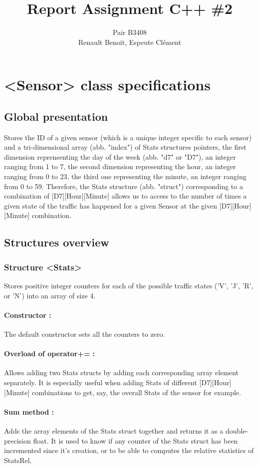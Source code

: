 \documentclass[10pt]{article}
\title{Report Assignment C++ \#2}
\author{Pair B3408 \\ {\sc Renault} Benoit, {\sc Espeute} Clément}
\date{}
\begin{document}
\pagestyle{fancy}
\maketitle
\section{<Sensor> class specifications}
\subsection{Global presentation}
Stores the ID of a given sensor (which is a unique integer specific to each sensor) and a tri-dimensional array (abb. "index") of Stats structures pointers, the first dimension reprensenting the day of the week (abb. "d7" or "D7"), an integer ranging from 1 to 7, the second dimension representing the hour, an integer ranging from 0 to 23, the third one representing the minute, an integer ranging from 0 to 59. Therefore, the Stats structure (abb. "struct") corresponding to a combination of [D7][Hour][Minute] allows us to access to the number of times a given state of the traffic has happened for a given Sensor at the given [D7][Hour][Minute] combination.

\subsection{Structures overview}
\subsubsection*{Structure <Stats>}
Stores positive integer counters for each of the possible traffic states ('V', 'J', 'R', or 'N') into an array of size 4.

\paragraph{Constructor :}
The default constructor sets all the counters to zero.

\paragraph{Overload of operator+= :}
Allows adding two Stats structs by adding each corresponding array element separately. It is especially useful when adding Stats of different [D7][Hour][Minute] combinations to get, say, the overall Stats of the sensor for example.

\paragraph{Sum method :}
Adds the array elements of the Stats struct together and returns it as a double-precision float. It is used to know if any counter of the Stats struct has been incremented since it's creation, or to be able to computes the relative statistics of StatsRel.
\end{document}
